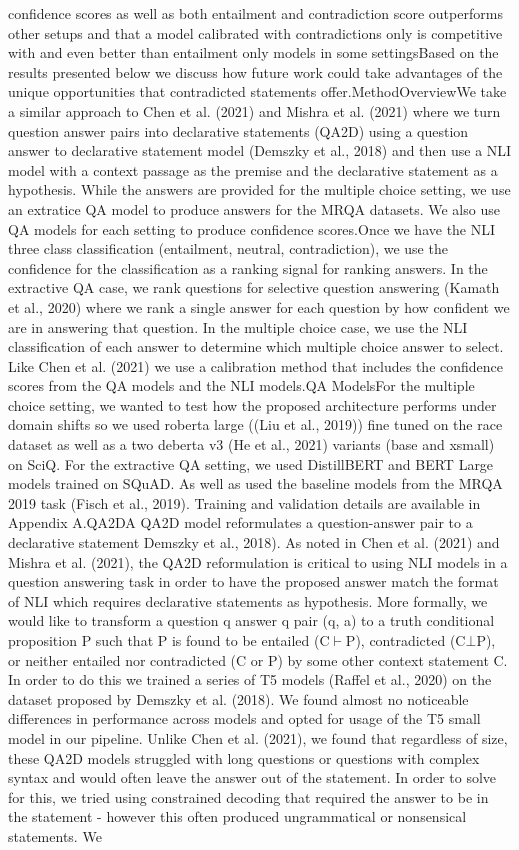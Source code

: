 \documentclass{scrbook}
\begin{document}
confidence scores as well as both entailment and contradiction score outperforms other setups and that a model calibrated with contradictions only is competitive with and even better than entailment only models in some settingsBased on the results presented below we discuss how future work could take advantages of the unique opportunities that contradicted statements offer.MethodOverviewWe take a similar approach to Chen et al. (2021) and Mishra et al. (2021) where we turn question answer pairs into declarative statements (QA2D) using a question answer to declarative statement model (Demszky et al., 2018) and then use a NLI model with a context passage as the premise and the declarative statement as a hypothesis. While the answers are provided for the multiple choice setting, we use an extratice QA model to produce answers for the MRQA datasets. We also use QA models for each setting to produce confidence scores.Once we have the NLI three class classification (entailment, neutral, contradiction), we use the confidence for the classification as a ranking signal for ranking answers. In the extractive QA case, we rank questions for selective question answering (Kamath et al., 2020) where we rank a single answer for each question by how confident we are in answering that question. In the multiple choice case, we use the NLI classification of each answer to determine which multiple choice answer to select. Like Chen et al. (2021) we use a calibration method that includes the confidence scores from the QA models and the NLI models.QA ModelsFor the multiple choice setting, we wanted to test how the proposed architecture performs under domain shifts so we used roberta large ((Liu et al., 2019)) fine tuned on the race dataset as well as a two deberta v3 (He et al., 2021) variants (base and xsmall) on SciQ. For the extractive QA setting, we used DistillBERT and BERT Large models trained on SQuAD. As well as used the baseline models from the MRQA 2019 task (Fisch et al., 2019). Training and validation details are available in Appendix A.QA2DA QA2D model reformulates a question-answer pair to a declarative statement Demszky et al., 2018). As noted in Chen et al. (2021) and Mishra et al. (2021), the QA2D reformulation is critical to using NLI models in a question answering task in order to have the proposed answer match the format of NLI which requires declarative statements as hypothesis. More formally, we would like to transform a question q answer q pair (q, a) to a truth conditional proposition P such that P is found to be entailed (C${\vdash}$P), contradicted (C${\bot}$P), or neither entailed nor contradicted (C or P) by some other context statement C. In order to do this we trained a series of T5 models (Raffel et al., 2020) on the dataset proposed by Demszky et al. (2018). We found almost no noticeable differences in performance across models and opted for usage of the T5 small model in our pipeline. Unlike Chen et al. (2021), we found that regardless of size, these QA2D models struggled with long questions or questions with complex syntax and would often leave the answer out of the statement. In order to solve for this, we tried using constrained decoding that required the answer to be in the statement - however this often produced ungrammatical or nonsensical statements. We 
\end{document}
